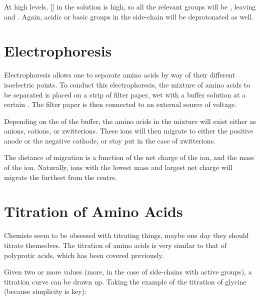 			At high \pH{} levels, [] in the solution is high, so all the relevant groups will be , leaving  and
			. Again, acidic or basic groups in the side-chain will be deprotonated as well.





	\section{Electrophoresis}

		Electrophoresis allows one to separate amino acids by way of their different isoelectric points. To conduct this electrophoresis, the
		mixture of amino acids to be separated is placed on a strip of filter paper, wet with a buffer solution at a certain \pH{}. The
		filter paper is then connected to an external source of voltage.

		Depending on the \pH{} of the buffer, the amino acids in the mixture will exist either as anions, cations, or zwitterions. These
		ions will then migrate to either the positive anode or the negative cathode, or stay put in the case of zwitterions.

		The distance of migration is a function of the net charge of the ion, and the mass of the ion. Naturally, ions with the lowest mass
		and largest net charge will migrate the furthest from the centre.



	\pagebreak
	\section{Titration of Amino Acids}

		Chemists seem to be obsessed with titrating things, maybe one day they should titrate themselves. The titration of amino acids is very
		similar to that of polyprotic acids, which has been covered previously.

		Given two or more \pKa{} values (more, in the case of side-chains with active groups), a titration curve can be drawn up. Taking
		the example of the titration of glycine (because simplicity is key):

